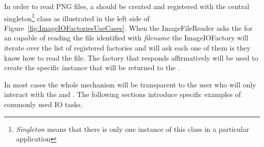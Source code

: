 In order to read PNG files, a  should be created and
registered with the central 
singleton\footnote{\emph{Singleton} means that there is only one instance of
this class in a particular application} class as illustrated in the left side
of Figure~\ref{fig:ImageIOFactoriesUseCases}. When the ImageFileReader asks the
 for an  capable of reading the file
identified with \emph{filename} the ImageIOFactory will iterate over the list
of registered factories and will ask each one of them is they know how to read
the file. The factory that responds affirmatively will be used to create the
specific  instance that will be returned to the
.

In most cases the whole mechanism will be transparent to the user who will only
interact with the  and . The
following sections introduce specific examples of commonly used IO tasks. 







